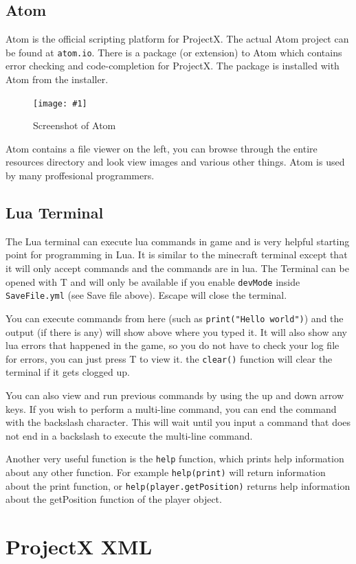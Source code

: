 \documentclass{book}
\newcommand{\fFigure}[2]
	{\begin{figure}[ht!]
		\centering
		\texttt{[image: \#1]}
		\caption{#2}
	\end{figure}}
\begin{document}
	\section{Atom}
	Atom is the official scripting platform for ProjectX. The actual Atom project can be found at \texttt{atom.io}. There is a package (or extension) to Atom which contains error checking and code-completion for ProjectX. The package is installed with Atom from the installer.
	
	\fFigure{Atom.png}{Screenshot of Atom}

	Atom contains a file viewer on the left, you can browse through the entire resources directory and look view images and various other things. Atom is used by many proffesional programmers.

	\section{Lua Terminal}
	The Lua terminal can execute lua commands in game and is very helpful starting point for programming in Lua. It is similar to the minecraft terminal except that it will only accept commands and the commands are in lua. The Terminal can be opened with T and will only be available if you enable \texttt{devMode} inside \texttt{SaveFile.yml} (see Save file above). Escape will close the terminal.

	You can execute commands from here (such as \texttt{print("Hello world")}) and the output (if there is any) will show above where you typed it. It will also show any lua errors that happened in the game, so you do not have to check your log file for errors, you can just press T to view it. the \texttt{clear()} function will clear the terminal if it gets clogged up.
	
	You can also view and run previous commands by using the up and down arrow keys. If you wish to perform a multi-line command, you can end the command with the backslash character. This will wait until you input a command that does not end in a backslash to execute the multi-line command.
	
	Another very useful function is the \texttt{help} function, which prints help information about any other function. For example \texttt{help(print)} will return information about the print function, or \texttt{help(player.getPosition)} returns help information about the getPosition function of the player object.
	
	\chapter{ProjectX XML}
\end{document}
